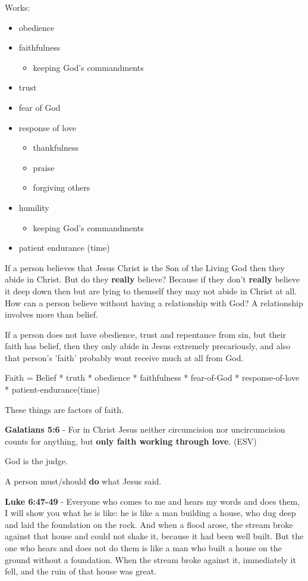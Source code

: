 \documentclass[11pt]{article}
\begin{document}
Works:
\begin{itemize}
\item obedience
\item faithfulness
\begin{itemize}
\item keeping God's commandments
\end{itemize}
\item trust
\item fear of God
\item response of love
\begin{itemize}
\item thankfulness
\item praise
\item forgiving others
\end{itemize}
\item humility
\begin{itemize}
\item keeping God's commandments
\end{itemize}
\item patient endurance (time)
\end{itemize}

If a person believes that Jesus Christ is the Son of the Living God then they abide in Christ.
But do they \textbf{really} believe? Because if they don't \textbf{really} believe it deep down then but are lying to themself they may not abide in Christ at all.
How can a person believe without having a relationship with God? A relationship involves more than belief.

If a person does not have obedience, trust and
repentance from sin, but their faith has belief, then they only
abide in Jesus extremely precariously, and also that person's 'faith' probably wont receive much at all from God.

Faith = Belief * truth * obedience * faithfulness * fear-of-God * response-of-love * patient-endurance(time)

These things are factors of faith.

\textbf{Galatians 5:6} - For in Christ Jesus neither circumcision nor uncircumcision counts for anything, but \textbf{only faith working through love}. (ESV)

God is the judge.

A person must/should \textbf{do} what Jesus said.

\textbf{Luke 6:47-49} - Everyone who comes to me and hears my words and does them, I will show you what he is like: he is like a man building a house, who dug deep and laid the foundation on the rock. And when a flood arose, the stream broke against that house and could not shake it, because it had been well built.  But the one who hears and does not do them is like a man who built a house on the ground without a foundation. When the stream broke against it, immediately it fell, and the ruin of that house was great.
\end{document}
